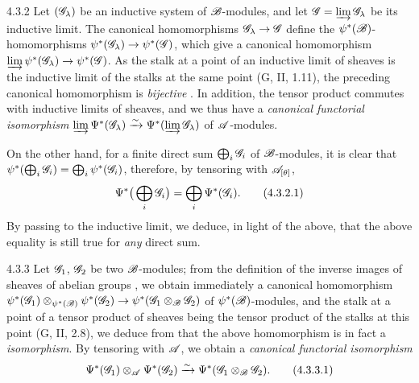 \begin{env}{4.3.2}
\label{env-0.4.3.2}
Let $(\mathscr{G}_\lambda)$ be an inductive system of $\mathscr{B}$-modules, and let
$\mathscr{G}=\varinjlim\mathscr{G}_\lambda$ be its inductive limit. The canonical homomorphisms
$\mathscr{G}_\lambda\to\mathscr{G}$ define the $\psi^*(\mathscr{B})$-homomorphisms
$\psi^*(\mathscr{G}_\lambda)\to\psi^*(\mathscr{G})$, which give a canonical homomorphism
$\varinjlim\psi^*(\mathscr{G}_\lambda)\to\psi^*(\mathscr{G})$. As the stalk at a point of an
inductive limit of sheaves is the inductive limit of the stalks at the same point
(G, II, 1.11), the preceding canonical homomorphism is \emph{bijective} .
In addition, the tensor product commutes with inductive limits of sheaves, and we thus have
a \emph{canonical functorial isomorphism}
$\varinjlim\Psi^*(\mathscr{G}_\lambda)\xrightarrow{\sim}\Psi^*(\varinjlim\mathscr{G}_\lambda)$ of $\mathscr{A}$-modules.

On the other hand, for a finite direct sum $\bigoplus_i\mathscr{G}_i$ of $\mathscr{B}$-modules, it is
clear that $\psi^*(\bigoplus_i\mathscr{G}_i)=\bigoplus_i\psi^*(\mathscr{G}_i)$, therefore, by
tensoring with $\mathscr{A}_{[\theta]}$,
\[
  \Psi^*\big(\bigoplus_i\mathscr{G}_i\big)=\bigoplus_i\Psi^*(\mathscr{G}_i).
  \tag{4.3.2.1}
\]
By passing to the inductive limit, we deduce, in light of the above, that the above
equality is still true for \emph{any} direct sum.
\end{env}

\begin{env}{4.3.3}
\label{env-0.4.3.3}
Let $\mathscr{G}_1$, $\mathscr{G}_2$ be two $\mathscr{B}$-modules; from the definition of the inverse images
of sheaves of abelian groups , we obtain immediately a canonical
homomorphism
$\psi^*(\mathscr{G}_1)\otimes_{\psi^*(\mathscr{B})}\psi^*(\mathscr{G}_2)
\to\psi^*(\mathscr{G}_1\otimes_\mathscr{B}\mathscr{G}_2)$ of $\psi^*(\mathscr{B})$-modules, and the stalk at a
point of a tensor product of sheaves being the tensor product of the stalks at this point
(G, II, 2.8), we deduce from  that the above homomorphism is in fact a
\emph{isomorphism}. By tensoring with $\mathscr{A}$, we obtain a \emph{canonical functorial
isomorphism}
\[
  \Psi^*(\mathscr{G}_1)\otimes_\mathscr{A}\Psi^*(\mathscr{G}_2)\xrightarrow{\sim}\Psi^*(\mathscr{G}_1\otimes_\mathscr{B}\mathscr{G}_2).
  \tag{4.3.3.1}
\]
\end{env}

